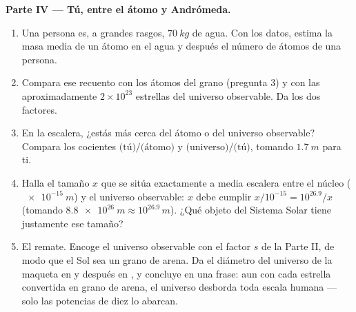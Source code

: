 \begin{problem}
\medskip
\noindent\textbf{Parte IV --- Tú, entre el átomo y Andrómeda.}
\begin{enumerate}[resume]
  \item Una persona es, a grandes rasgos, $\qty{70}{kg}$ de agua. Con
        los datos, estima la masa media de un átomo en el agua y después
        el número de átomos de una persona.
  \item Compara ese recuento con los átomos del grano (pregunta 3) y con
        las aproximadamente $2\times10^{23}$ estrellas del universo
        observable. Da los dos factores.
  \item En la escalera, ¿estás más cerca del átomo o del universo
        observable? Compara los cocientes $\text{(tú)}/\text{(átomo)}$ y
        $\text{(universo)}/\text{(tú)}$, tomando $\qty{1.7}{m}$ para ti.
  \item Halla el tamaño $x$ que se sitúa exactamente a media escalera
        entre el núcleo ($\qty{e-15}{m}$) y el universo observable: $x$
        debe cumplir $x / 10^{-15} = 10^{26.9} / x$ (tomando
        $\qty{8.8e26}{m} \approx 10^{26.9}\,\unit{m}$). ¿Qué objeto del
        Sistema Solar tiene justamente ese tamaño?
  \item El remate. Encoge el universo observable con el factor $s$ de la
        Parte II, de modo que el Sol sea un grano de arena. Da el
        diámetro del universo de la maqueta en  y después en
        , y concluye en una frase: aun con cada
        estrella convertida en grano de arena, el universo desborda toda
        escala humana --- solo las potencias de diez lo abarcan.
\end{enumerate}
\end{problem}
